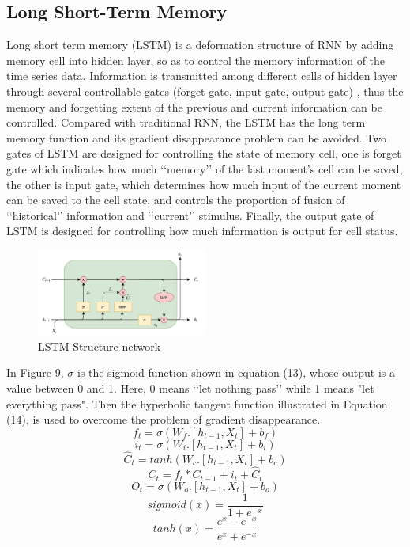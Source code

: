 \documentclass{ieeeojies}
\begin{document}
\subsection{Long Short-Term Memory}
Long short term memory (LSTM) \cite{b12} is a deformation structure of RNN by adding memory cell into hidden layer, so as to control the memory information of the time series data. Information is transmitted among different cells of hidden layer through several controllable gates (forget gate, input gate, output gate) \cite{b13}, thus the memory and forgetting extent of the previous and current information can be controlled. Compared with traditional RNN, the LSTM has the long term memory function and its gradient disappearance problem can be avoided. Two gates of LSTM are designed for controlling the state of memory cell, one is forget gate which indicates how much ‘‘memory’’ of the last moment’s cell can be saved, the other is input gate, which determines how much input of the current moment can be saved to the cell state, and controls the proportion of fusion of ‘‘historical’’ information and ‘‘current’’ stimulus. Finally, the output gate of LSTM is designed for controlling how much information is output for cell status.
\begin{figure} [H]
    \centering
    \includegraphics[width=0.5\textwidth]{bibliography/Figure/LSTM _structure.png}
    \caption{LSTM Structure network}
    \label{fig:LSTM structure}
\end{figure}

In Figure 9, $\sigma$ is the sigmoid function shown in equation (13), whose output is a value between 0 and 1. Here, 0 means ‘‘let nothing pass’’ while 1 means "let everything pass". Then the hyperbolic tangent function illustrated in Equation (14), is used to overcome the problem of gradient disappearance.
\begin{equation}
    f_t = \sigma(W_f.[h_{t-1}, X_t] + b_f)
\end{equation}
\begin{equation}
    i_t = \sigma(W_i.[h_{t-1}, X_t] + b_i)
\end{equation}
\begin{equation}
    \hat{C}_t = tanh(W_c.[h_{t-1}, X_t] + b_c)
\end{equation}
\begin{equation}
    C_t = f_t*C_{t-1} + i_t + \hat{C}_t
\end{equation}
\begin{equation}
    O_t = \sigma(W_o.[h_{t-1}, X_t] + b_o)
\end{equation}
\begin{equation}
    sigmoid(x) = \frac{1}{1+e^{-x}}
\end{equation}
\begin{equation}
    tanh(x) = \frac{e^x - e^{-x}}{e^x + e^{-x}}
\end{equation}
\end{document}
